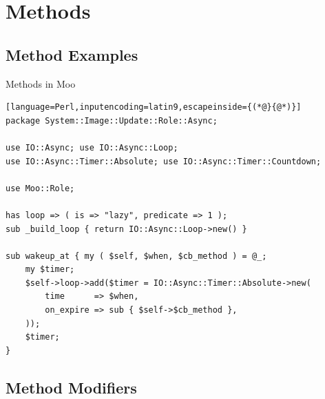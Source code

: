 \documentclass[ngerman,xcolor={table,dvipsnames},smaller,compress,hyperref={bookmarks,colorlinks}]{beamer}%
\begin{document}
\section{Methods}

\subsection{Method Examples}

\begin{frame}[t,fragile]

\begin{block}{Methods in Moo}
\scriptsize
\begin{lstlisting}[language=Perl,inputencoding=latin9,escapeinside={(*@}{@*)}]
package System::Image::Update::Role::Async;

use IO::Async; use IO::Async::Loop;
use IO::Async::Timer::Absolute; use IO::Async::Timer::Countdown;

use Moo::Role;

has loop => ( is => "lazy", predicate => 1 );
sub _build_loop { return IO::Async::Loop->new() }

sub wakeup_at { my ( $self, $when, $cb_method ) = @_;
    my $timer;
    $self->loop->add($timer = IO::Async::Timer::Absolute->new(
        time      => $when,
        on_expire => sub { $self->$cb_method },
    ));
    $timer;
}
\end{lstlisting}
\end{block}


\end{frame}

\subsection{Method Modifiers}
\end{document}
